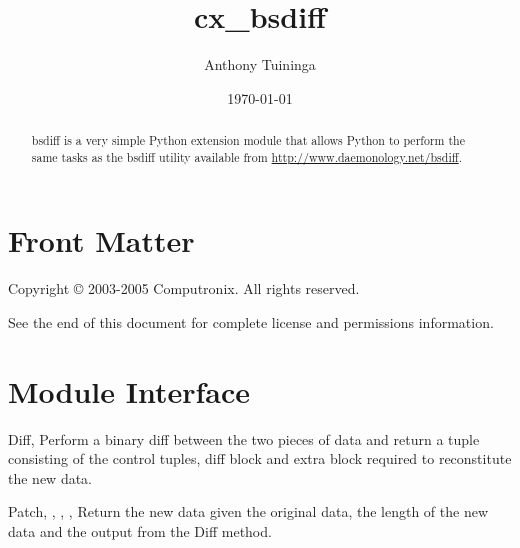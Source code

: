 \documentclass{manual}
\title{cx\_bsdiff}
\author{Anthony Tuininga}
\date{\today}                   %
\begin{document}
\maketitle

\ifhtml
\chapter*{Front Matter\label{front}}
\fi

Copyright \copyright{} 2003-2005 Computronix.
All rights reserved.

See the end of this document for complete license and permissions
information.

\begin{abstract}

\noindent
bsdiff is a very simple Python extension module that allows Python to perform
the same tasks as the bsdiff utility available from
\url{http://www.daemonology.net/bsdiff}.

\end{abstract}

\tableofcontents

\chapter{Module Interface\label{module}}

\begin{funcdesc}{Diff}{, }
  Perform a binary diff between the two pieces of data and return a tuple
  consisting of the control tuples, diff block and extra block required to
  reconstitute the new data.
\end{funcdesc}

\begin{funcdesc}{Patch}{, ,
      , , }
  Return the new data given the original data, the length of the new data and
  the output from the Diff method.
\end{funcdesc}


\end{document}
